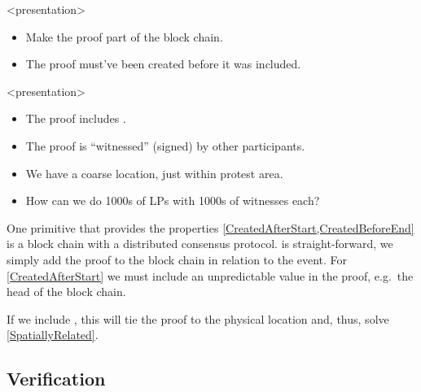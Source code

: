 \begin{frame}<presentation>
  \begin{solution}
    \begin{itemize}
      \item Make the proof part of the block chain.
      \item The proof must've been created before it was included.
    \end{itemize}
  \end{solution}
\end{frame}

\begin{frame}<presentation>
  \begin{solution}
    \begin{itemize}
      \item The proof includes .
      \item The proof is \enquote{witnessed} (signed) by other participants.
      \item We have a coarse location, just within protest area.
    \end{itemize}
  \end{solution}

  \pause

  \begin{question}
    \begin{itemize}
      \item How can we do 1000s of \acp{LP} with 1000s of witnesses each?
    \end{itemize}
  \end{question}
\end{frame}

One primitive that provides the properties 
\cref{CreatedAfterStart,CreatedBeforeEnd} is a block chain with a distributed 
consensus protocol.
 is straight-forward, we simply add the proof to the 
block chain in relation to the event.
For \cref{CreatedAfterStart} we must include an unpredictable value in the 
proof, e.g.\ the head of the block chain.

If we include , this will tie the proof to the physical location and, 
thus, solve \cref{SpatiallyRelated}.

\subsection{Verification}
\label{Verification}

